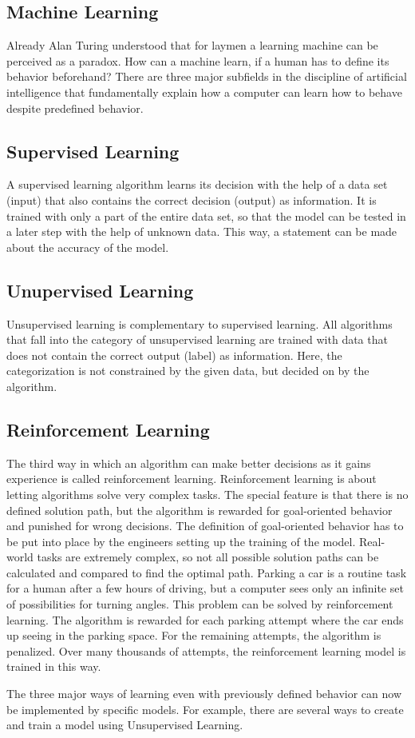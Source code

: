 		\subsection{Machine Learning}
		Already Alan Turing understood that for laymen a learning machine can be perceived as a paradox.  How can a machine learn, if a human has to define its behavior beforehand? There are three major subfields in the discipline of artificial intelligence that fundamentally explain how a computer can learn how to behave despite predefined behavior.
		
		\subsection{Supervised Learning}
		A supervised learning algorithm learns its decision with the help of a data set (input) that also contains the correct decision (output) as information. It is trained with only a part of the entire data set, so that the model can be tested in a later step with the help of unknown data. This way, a statement can be made about the accuracy of the model.
		
		\subsection{Unupervised Learning}
		Unsupervised learning is complementary to supervised learning. All algorithms that fall into the category of unsupervised learning are trained with data that does not contain the correct output (label) as information. Here, the categorization is not constrained by the given data, but decided on by the algorithm.
		
		\subsection{Reinforcement Learning}
		The third way in which an algorithm can make better decisions as it gains experience is called reinforcement learning. Reinforcement learning is about letting algorithms solve very complex tasks. The special feature is that there is no defined solution path, but the algorithm is rewarded for goal-oriented behavior and punished for wrong decisions. The definition of goal-oriented behavior has to be put into place by the engineers setting up the training of the model. Real-world tasks are extremely complex, so not all possible solution paths can be calculated and compared to find the optimal path. Parking a car is a routine task for a human after a few hours of driving, but a computer sees only an infinite set of possibilities for turning angles. This problem can be solved by reinforcement learning. The algorithm is rewarded for each parking attempt where the car ends up seeing in the parking space. For the remaining attempts, the algorithm is penalized. Over many thousands of attempts, the reinforcement learning model is trained in this way.
		
		The three major ways of learning even with previously defined behavior can now be implemented by specific models. For example, there are several ways to create and train a model using Unsupervised Learning.
		